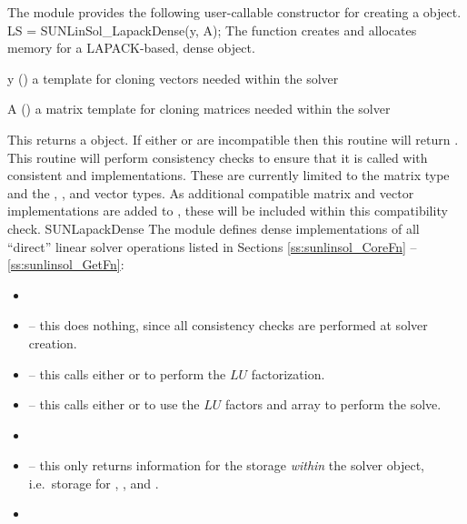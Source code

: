 The {\sunlinsollapdense} module provides the following user-callable constructor
for creating a \newline {} object.
%
%
{
  LS = SUNLinSol\_LapackDense(y, A);
}
{
  The function  creates and allocates memory for
  a LAPACK-based, dense  object.
}
{
  \begin{args}[y]
  \item[y] ()
    a template for cloning vectors needed within the solver
  \item[A] ()
    a {\sunmatdense} matrix template for cloning matrices needed
    within the solver 
  \end{args}
}
{
  This returns a  object.  If either  or
   are incompatible then this routine will return .
}
{
  This routine will perform consistency checks to ensure that it is
  called with consistent {\nvector} and {\sunmatrix} implementations.
  These are currently limited to the {\sunmatdense} matrix type and
  the {\nvecs}, {\nvecopenmp}, and {\nvecpthreads} vector types.  As
  additional compatible matrix and vector implementations are added to
  {\sundials}, these will be included within this compatibility check.
}
{SUNLapackDense}
%
%
The {\sunlinsollapdense} module defines dense implementations of all
``direct'' linear solver operations listed in Sections
\ref{ss:sunlinsol_CoreFn} -- \ref{ss:sunlinsol_GetFn}:
\begin{itemize}
\item {}
\item {} -- this does nothing, since all
  consistency checks are performed at solver creation.
\item {} -- this calls either
   or  to perform the $LU$ factorization.
\item {} -- this calls either
   or  to use the $LU$ factors and 
  array to perform the solve.
\item {}
\item {} -- this only returns information for
  the storage \emph{within} the solver object, i.e.~storage
  for , , and .
\item {}
\end{itemize}


